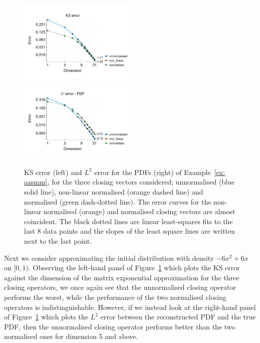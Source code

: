 \begin{example}\label{ex: aasmm}
	\begin{figure}[h]
		\centering
		\includegraphics[width=0.5\textwidth,trim={0.5cm 0.8cm 0.2cm 1.25cm},clip]{chapter6/figs/qbdrap_closing_vec/fun6/ks_error_formatted.pdf}%
		\includegraphics[width=0.5\textwidth,trim={0.5cm 0.8cm 0.2cm 1.25cm},clip]{chapter6/figs/qbdrap_closing_vec/fun6/l2_pdf_error_formatted.pdf}
		\caption{KS error (left) and \(L^2\) error for the PDFs (right) of Example~\ref{ex: aasmm}, for the three closing vectors considered; unnormalised (blue solid line), non-linear normalised (orange dashed line) and normalised (green dash-dotted line). The error curves for the non-linear normalised (orange) and normalised closing vectors are almost coincident. The black dotted lines are linear least-squares fits to the last 8 data points and the slopes of the least square lines are written next to the last point.}
		\label{fig: fun 6 ks error qbdrap closing vecs}
	\end{figure}
	Next we consider approximating the initial distribution with density \(-6x^2+6x\) on \([0,1)\). Observing the left-hand panel of Figure~\ref{fig: fun 6 ks error qbdrap closing vecs} which plots the KS error against the dimension of the matrix exponential approximation for the three closing operators, we once again see that the unnormalised closing operator performs the worst, while the performance of the two normalised closing operators is indistinguishable. However, if we instead look at the right-hand panel of Figure~\ref{fig: fun 6 ks error qbdrap closing vecs} which plots the \(L^2\) error between the reconstructed PDF and the true PDF, then the unnormalised closing operator performs better than the two normalised ones for dimension 5 and above. 


\end{example}
